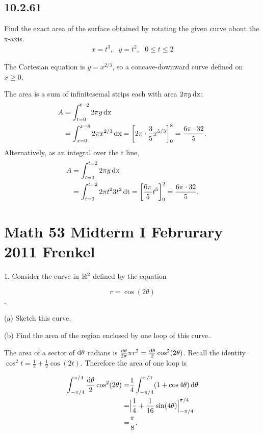 \documentclass[12pt]{article}
\begin{document}
\subsection*{10.2.61}
Find the exact area of the surface obtained by rotating the given curve about
the x-axis.
\begin{align*}
  x = t^3, ~~~ y = t^2, ~~~ 0 \leq t \leq 2
\end{align*}
\begin{mdframed}
The Cartesian equation is $y = x^{2/3}$, so a concave-downward curve defined on $x \geq 0$.

The area is a sum of infinitesemal strips each with area $2\pi y\operatorname{\text{dx}}$:
\begin{align*}
  A &= \int_{t=0}^{t=2} 2\pi y\operatorname{\text{dx}} \\
    &= \int_{x=0}^{x=8} 2\pi x^{2/3}\operatorname{\text{dx}} = \left[ 2\pi \cdot \frac{3}{5} x^{5/3} \right]_0^8 = \frac{6\pi \cdot 32}{5}.\\
\end{align*}
Alternatively, as an integral over the t line,
\begin{align*}
  A &= \int_{t=0}^{t=2} 2\pi y\operatorname{\text{dx}} \\
    &= \int_{t=0}^{t=2} 2\pi t^2 3t^2 \operatorname{\text{dt}} = \left[ \frac{6\pi}{5} t^{5} \right]_0^2 = \frac{6\pi \cdot 32}{5}.
\end{align*}
\end{mdframed}

\newpage
\section*{Math 53 Midterm I Februrary 2011 Frenkel}

1. Consider the curve in $\mathbb{R}^2$ defined by the equation

$$
r = \cos(2\theta)
$$.

(a) Sketch this curve.

(b) Find the area of the region enclosed by one loop of this curve.\\

\begin{mdframed}
The area of a sector of $\operatorname{\text{d}\theta}$ radians is $\frac{\operatorname{\text{d}\theta}}{2\pi}\pi r^2 = \frac{\operatorname{\text{d}\theta}}{2}\cos^2(2\theta)$. Recall the identity $\cos^2 t = \frac{1}{2} + \frac{1}{2}\cos(2t)$. Therefore the area of one loop is

\begin{align*}
  \int_{-\pi/4}^{\pi/4} \frac{\operatorname{\text{d}\theta}}{2}\cos^2(2\theta)
  =&\frac{1}{4}\int_{-\pi/4}^{\pi/4} (1 + \cos 4\theta) \operatorname{\text{d}\theta} \\
  =& \Big|\frac{1}{4} + \frac{1}{16}\sin(4\theta)\Big|_{-\pi/4}^{\pi/4} \\
  =& \frac{\pi}{8}.
\end{align*}

\end{mdframed}~\\
\end{document}
